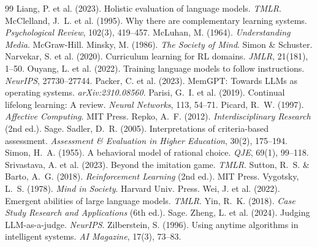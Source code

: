 \documentclass[11pt,a4paper]{article}
\begin{document}
\begin{thebibliography}{99}
 Liang, P. et al. (2023). Holistic evaluation of language models. \emph{TMLR}.
 McClelland, J.~L. et al. (1995). Why there are complementary learning systems. \emph{Psychological Review}, 102(3), 419--457.
 McLuhan, M. (1964). \emph{Understanding Media}. McGraw-Hill.
 Minsky, M. (1986). \emph{The Society of Mind}. Simon \& Schuster.
 Narvekar, S. et al. (2020). Curriculum learning for RL domains. \emph{JMLR}, 21(181), 1--50.
 Ouyang, L. et al. (2022). Training language models to follow instructions. \emph{NeurIPS}, 27730--27744.
 Packer, C. et al. (2023). MemGPT: Towards LLMs as operating systems. \emph{arXiv:2310.08560}.
 Parisi, G.~I. et al. (2019). Continual lifelong learning: A review. \emph{Neural Networks}, 113, 54--71.
 Picard, R.~W. (1997). \emph{Affective Computing}. MIT Press.
 Repko, A.~F. (2012). \emph{Interdisciplinary Research} (2nd ed.). Sage.
 Sadler, D.~R. (2005). Interpretations of criteria-based assessment. \emph{Assessment \& Evaluation in Higher Education}, 30(2), 175--194.
 Simon, H.~A. (1955). A behavioral model of rational choice. \emph{QJE}, 69(1), 99--118.
 Srivastava, A. et al. (2023). Beyond the imitation game. \emph{TMLR}.
 Sutton, R.~S. \& Barto, A.~G. (2018). \emph{Reinforcement Learning} (2nd ed.). MIT Press.
 Vygotsky, L.~S. (1978). \emph{Mind in Society}. Harvard Univ. Press.
 Wei, J. et al. (2022). Emergent abilities of large language models. \emph{TMLR}.
 Yin, R.~K. (2018). \emph{Case Study Research and Applications} (6th ed.). Sage.
 Zheng, L. et al. (2024). Judging LLM-as-a-judge. \emph{NeurIPS}.
 Zilberstein, S. (1996). Using anytime algorithms in intelligent systems. \emph{AI Magazine}, 17(3), 73--83.
\end{thebibliography}
\end{document}
